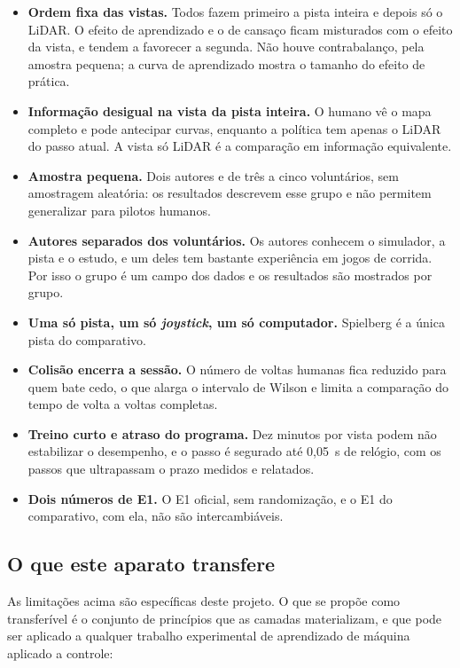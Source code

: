 \begin{itemize}
    \item \textbf{Ordem fixa das vistas.} Todos fazem primeiro a pista inteira e
          depois só o LiDAR. O efeito de aprendizado e o de cansaço ficam misturados
          com o efeito da vista, e tendem a favorecer a segunda. Não houve
          contrabalanço, pela amostra pequena; a curva de aprendizado mostra o
          tamanho do efeito de prática.
    \item \textbf{Informação desigual na vista da pista inteira.} O humano vê o
          mapa completo e pode antecipar curvas, enquanto a política tem apenas o
          LiDAR do passo atual. A vista só LiDAR é a comparação em informação
          equivalente.
    \item \textbf{Amostra pequena.} Dois autores e de três a cinco voluntários, sem
          amostragem aleatória: os resultados descrevem esse grupo e não permitem
          generalizar para pilotos humanos.
    \item \textbf{Autores separados dos voluntários.} Os autores conhecem o
          simulador, a pista e o estudo, e um deles tem bastante experiência em jogos
          de corrida. Por isso o grupo é um campo dos dados e os resultados são
          mostrados por grupo.
    \item \textbf{Uma só pista, um só \textit{joystick}, um só computador.} Spielberg
          é a única pista do comparativo.
    \item \textbf{Colisão encerra a sessão.} O número de voltas humanas fica
          reduzido para quem bate cedo, o que alarga o intervalo de Wilson e
          limita a comparação do tempo de volta a voltas completas.
    \item \textbf{Treino curto e atraso do programa.} Dez minutos por vista podem não
          estabilizar o desempenho, e o passo é segurado até 0,05~s de relógio, com
          os passos que ultrapassam o prazo medidos e relatados.
    \item \textbf{Dois números de E1.} O E1 oficial, sem randomização, e o E1 do
          comparativo, com ela, não são intercambiáveis.
\end{itemize}

\subsection{O que este aparato transfere}

As limitações acima são específicas deste projeto. O que se propõe como
transferível é o conjunto de princípios que as camadas materializam, e que pode
ser aplicado a qualquer trabalho experimental de aprendizado de máquina aplicado
a controle:

